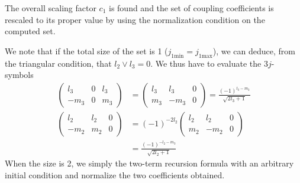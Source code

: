 The overall scaling factor $c_1$ is found and the set of 
coupling coefficients is rescaled to its proper value
by using the normalization condition on the computed set.

We note that if the total size of the set is 1 ($j_{1\text{min}}=j_{1\text{max}}$), 
we can deduce, from the triangular condition, that $l_2\lor l_3=0$. We thus have
to evaluate the $3j$-symbols 
  \begin{align*}
   \begin{pmatrix} l_3 & 0 & l_3 \\ -m_3 & 0 & m_3 \end{pmatrix} &= \begin{pmatrix} l_3 & l_3 & 0 \\ m_3 & -m_3 & 0\end{pmatrix}=\frac{(-1)^{l_3-m_3}}{\sqrt{2l_3+1}}	\\
   \begin{pmatrix} l_2 & l_2 & 0 \\ -m_2 & m_2 & 0 \end{pmatrix} &= (-1)^{-2l_2}\begin{pmatrix} l_2 & l_2 & 0 \\ m_2 & -m_2 & 0\end{pmatrix}\\&=\frac{(-1)^{-l_2-m_3}}{\sqrt{2l_2+1}}
  \end{align*}
When the size is 2, we simply the two-term recursion formula with an arbitrary 
initial condition and normalize the two coefficients obtained. 

